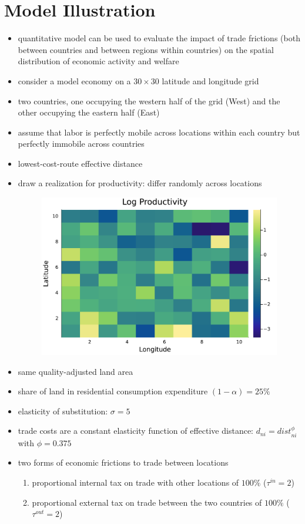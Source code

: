 \documentclass[11pt]{article}
\begin{document}
\section*{Model Illustration}
\begin{itemize}
\item quantitative model can be used to evaluate the impact of trade frictions (both between countries and between regions within countries) on the spatial distribution of economic activity and welfare
\item consider a model economy on a $30 \times 30$ latitude and longitude grid
\item two countries, one occupying the western half of the grid (West) and the other occupying the eastern half (East)
\item assume that labor is perfectly mobile across locations within each country but perfectly immobile across countries
\item lowest-cost-route effective distance
\item draw a realization for productivity: differ randomly across locations
\begin{figure}[H]
\centering
\includegraphics[scale=0.5]{../graph/H_cnty_initial_prod.pdf}
\end{figure}
\item same quality-adjusted land area
\item share of land in residential consumption expenditure $(1 - \alpha ) = 25\%$
\item elasticity of substitution: $\sigma = 5$
\item trade costs are a constant elasticity function of effective distance: $d_{ni} = dist^{\phi}_{ni}$ with $\phi = 0.375$
\item two forms of economic frictions to trade between locations
\begin{enumerate}
\item proportional internal tax on trade with other locations of $100 \%$ ($\tau^{in} = 2$)
\item proportional external tax on trade between the two countries of $100 \%$ ($\tau^{out} = 2$)
\end{enumerate}
\end{itemize}
\end{document}
